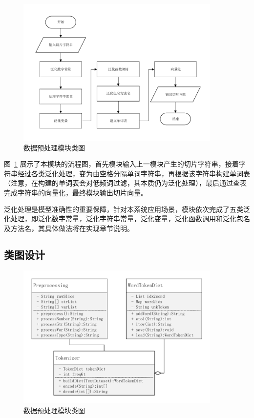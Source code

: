 \begin{figure}[!htb]
    \centering
    \includegraphics[width=0.9\textwidth]{FIGs/chapter3/preProcessing.pdf}
    \caption{数据预处理模块类图}\label{preProcessing}
\end{figure}

图~\ref{preProcessing} 展示了本模块的流程图，首先模块输入上一模块产生的切片字符串，接着字符串经过各类泛化处理，变为由空格分隔单词字符串，再根据该字符串构建单词表（注意，在构建的单词表会对低频词过滤，其本质仍为泛化处理），最后通过查表完成字符串的向量化，最终模块输出切片向量。

泛化处理是模型准确性的重要保障，针对本系统应用场景，模块依次完成了五类泛化处理，即泛化数字常量，泛化字符串常量，泛化变量，泛化函数调用和泛化包名及方法名，其具体做法将在实现章节说明。\\

\subsection{类图设计}

\begin{figure}[!htb]
    \centering
    \includegraphics[width=0.9\textwidth]{FIGs/chapter3/preClass.pdf}
    \caption{数据预处理模块类图}\label{preClass}
\end{figure}

